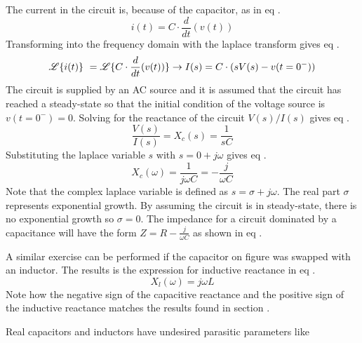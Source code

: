 The current in the circuit is, because of the capacitor, as in eq .
\begin{equation}\label{eq:4_1_1_CapCurrent}
    i(t) = C\cdot\frac{d}{dt} (v(t))
\end{equation}
Transforming  into the frequency domain with the laplace transform gives eq .
\begin{equation}\label{eq:4_1_1_CapCurrent2}
    \mathscr{L}\{\/i(t)\}\ = \mathscr{L}\{\/C\cdot\frac{d}{dt} (v(t))\} \rightarrow I(s) = C\cdot(sV(s) - v(t=0^-))
\end{equation}
The circuit is supplied by an AC source and it is assumed that the circuit has reached a steady-state so that the initial condition of the voltage source is $v(t=0^-) = 0$. Solving for the reactance of the circuit $V(s) / I(s)$ gives eq .
\begin{equation}\label{eq:4_1_1_CapCurrent3}
    \frac{V(s)}{I(s)} =X_c(s)= \frac{1}{sC}
\end{equation}
Substituting the laplace variable $s$ with $s = 0 + j\omega$ gives eq .
\begin{equation}\label{eq:4_1_1_CapCurrent4}
    X_c(\omega) = \frac{1}{j\omega C}=-\frac{j}{\omega C}
\end{equation}
Note that the complex laplace variable is defined as $s = \sigma + j\omega$. The real part $\sigma$ represents exponential growth. By assuming the circuit is in steady-state, there is no exponential growth so $\sigma = 0$. The impedance for a circuit dominated by a capacitance will have the form $Z = R -\frac{j}{\omega C}$ as shown in eq .

A similar exercise can be performed if the capacitor on figure  was swapped with an inductor. The results is the expression for inductive reactance in eq .
\begin{equation}\label{eq:4_1_1_IndReactance}
    X_l(\omega) = j \omega L
\end{equation}
Note how the negative sign of the capacitive reactance and the positive sign of the inductive reactance matches the results found in section .

Real capacitors and inductors have undesired parasitic parameters like 
